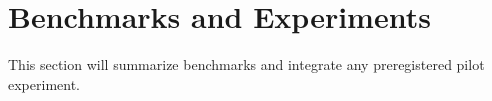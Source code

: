\section{Benchmarks and Experiments}

This section will summarize benchmarks and integrate any preregistered pilot experiment.

